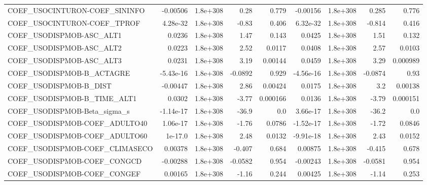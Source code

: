 \begin{tabular}{lrrrrrrrr}
COEF\_USOCINTURON-COEF\_SININFO     &    -0.00506 &     1.8e+308 &      0.28 &    0.779 &   -0.00156 &    1.8e+308 &        0.285 &         0.776 \\
COEF\_USOCINTURON-COEF\_TPROF       &    4.28e-32 &     1.8e+308 &     -0.83 &    0.406 &   6.32e-32 &    1.8e+308 &       -0.814 &         0.416 \\
COEF\_USODISPMOB-ASC\_ALT1          &      0.0236 &     1.8e+308 &      1.47 &    0.143 &     0.0425 &    1.8e+308 &         1.51 &         0.132 \\
COEF\_USODISPMOB-ASC\_ALT2          &      0.0223 &     1.8e+308 &      2.52 &   0.0117 &     0.0408 &    1.8e+308 &         2.57 &        0.0103 \\
COEF\_USODISPMOB-ASC\_ALT3          &      0.0231 &     1.8e+308 &      3.19 &  0.00144 &     0.0459 &    1.8e+308 &         3.29 &      0.000989 \\
COEF\_USODISPMOB-B\_ACTAGRE         &   -5.43e-16 &     1.8e+308 &   -0.0892 &    0.929 &  -4.56e-16 &    1.8e+308 &      -0.0874 &          0.93 \\
COEF\_USODISPMOB-B\_DIST            &    -0.00447 &     1.8e+308 &      2.86 &  0.00424 &     0.0175 &    1.8e+308 &          3.2 &       0.00138 \\
COEF\_USODISPMOB-B\_TIME\_ALT1       &      0.0302 &     1.8e+308 &     -3.77 & 0.000166 &     0.0136 &    1.8e+308 &        -3.79 &      0.000151 \\
COEF\_USODISPMOB-Beta\_sigma\_s      &   -1.14e-17 &     1.8e+308 &     -36.9 &      0.0 &   3.66e-17 &    1.8e+308 &        -36.2 &           0.0 \\
COEF\_USODISPMOB-COEF\_ADULTO40     &    1.06e-17 &     1.8e+308 &     -1.76 &   0.0786 &  -1.52e-17 &    1.8e+308 &        -1.72 &        0.0846 \\
COEF\_USODISPMOB-COEF\_ADULTO60     &     1e-17.0 &     1.8e+308 &      2.48 &   0.0132 &  -9.91e-18 &    1.8e+308 &         2.43 &        0.0152 \\
COEF\_USODISPMOB-COEF\_CLIMASECO    &     0.00378 &     1.8e+308 &    -0.407 &    0.684 &    0.00875 &    1.8e+308 &       -0.415 &         0.678 \\
COEF\_USODISPMOB-COEF\_CONGCD       &    -0.00288 &     1.8e+308 &   -0.0582 &    0.954 &   -0.00243 &    1.8e+308 &      -0.0581 &         0.954 \\
COEF\_USODISPMOB-COEF\_CONGEF       &     0.00165 &     1.8e+308 &     -1.16 &    0.244 &    0.00425 &    1.8e+308 &        -1.14 &         0.253 \\

\end{tabular}
